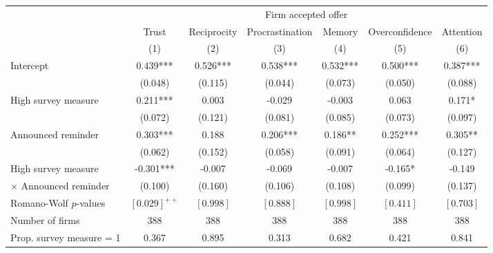 \begin{tabular}[t]{lcccccc}
\toprule
& \multicolumn{6}{c}{Firm accepted offer} \\
\cmidrule(lr){2-7} 

  & Trust & Reciprocity & Procrastination & Memory & Overconfidence & Attention\\
& (1) & (2) & (3) & (4) & (5) & (6)\\
\midrule
Intercept & 0.439*** & 0.526*** & 0.538*** & 0.532*** & 0.500*** & 0.387***\\
 & (0.048) & (0.115) & (0.044) & (0.073) & (0.050) & (0.088)\\
High survey measure & 0.211*** & 0.003 & -0.029 & -0.003 & 0.063 & 0.171*\\
 & (0.072) & (0.121) & (0.081) & (0.085) & (0.073) & (0.097)\\
Announced reminder & 0.303*** & 0.188 & 0.206*** & 0.186** & 0.252*** & 0.305**\\
 & (0.062) & (0.152) & (0.058) & (0.091) & (0.064) & (0.127)\\
High survey measure & -0.301*** & -0.007 & -0.069 & -0.007 & -0.165* & -0.149\\
 \quad $\times$ Announced reminder & (0.100) & (0.160) & (0.106) & (0.108) & (0.099) & (0.137)\\
Romano-Wolf $p$-values &$[0.029]^{++}$ &$[0.998]$ &$[0.888]$ &$[0.998]$ &$[0.411]$ &$[0.703]$ \\
\midrule
Number of firms & 388 & 388 & 388 & 388 & 388 & 388\\
Prop. survey measure = 1 & 0.367 & 0.895 & 0.313 & 0.682 & 0.421 & 0.841\\
\bottomrule
\end{tabular}
